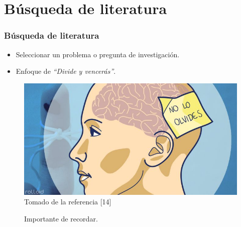 \documentclass{beamer}
\begin{document}
\section{B\'usqueda de literatura} 
 \begin{frame}\frametitle{B\'usqueda de literatura}
    \begin{multicols}{2}  
        \begin{itemize}
            \item Seleccionar un problema o pregunta de investigaci\'on.
            \item Enfoque de \emph{\enquote{Divide y vencer\'as}}.
        \end{itemize} 
        \begin{figure}
                \includegraphics[scale=0.25]{figures/recordar}
                \newline
                {\tiny Tomado de la referencia [14] }
                \caption{Importante de recordar. }
            \end{figure}
        \end{multicols}
    \end{frame}
\end{document}
